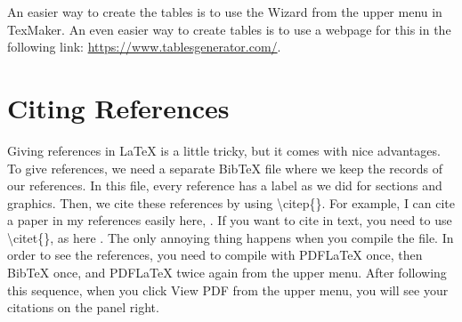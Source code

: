 \documentclass[12pt]{article}
\begin{document}
An easier way to create the tables is to use the Wizard from the upper menu in TexMaker. An even easier way to create tables is to use a webpage for this in the following link: \url{https://www.tablesgenerator.com/}.


\section{Citing References} \label{references}

Giving references in LaTeX is a little tricky, but it comes with nice advantages. To give references, we need a separate BibTeX file where we keep the records of our references. In this file, every reference has a label as we did for sections and graphics. Then, we cite these references by using \textbackslash citep\{\}. For example, I can cite a paper in my references easily here, \citep{brown1975}. If you want to cite in text, you need to use \textbackslash citet\{\}, as here \citet{tippett1931}. The only annoying thing happens when you compile the file. In order to see the references, you need to compile with PDFLaTeX once, then BibTeX once, and PDFLaTeX twice again from the upper menu. After following this sequence, when you click View PDF from the upper menu, you will see your citations on the panel right. 


%

\end{document}
